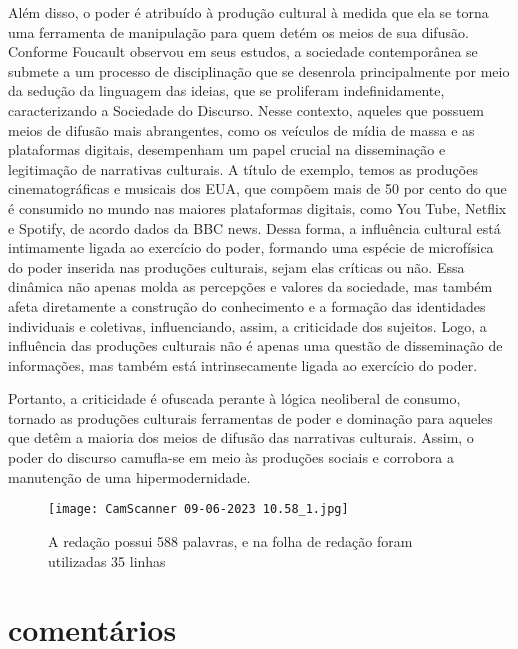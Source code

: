 \documentclass{article}
\begin{document}
Além disso, o poder é atribuído à produção cultural à medida que ela se torna uma ferramenta de manipulação para quem detém os meios de sua difusão. Conforme Foucault observou em seus estudos, a sociedade contemporânea se submete a um processo de disciplinação que se desenrola principalmente por meio da sedução da linguagem das ideias, que se proliferam indefinidamente, caracterizando a Sociedade do Discurso. Nesse contexto, aqueles que possuem meios de difusão mais abrangentes, como os veículos de mídia de massa e as plataformas digitais, desempenham um papel crucial na disseminação e legitimação de narrativas culturais. A título de exemplo, temos as produções cinematográficas e musicais dos EUA, que compõem mais de 50 por cento do que é consumido no mundo nas maiores plataformas digitais, como You Tube, Netflix e Spotify, de acordo dados da BBC news. Dessa forma, a influência cultural está intimamente ligada ao exercício do poder, formando uma espécie de microfísica do poder inserida nas produções culturais, sejam elas críticas ou não. Essa dinâmica não apenas molda as percepções e valores da sociedade, mas também afeta diretamente a construção do conhecimento e a formação das identidades individuais e coletivas, influenciando, assim, a criticidade dos sujeitos. Logo, a influência das produções culturais não é apenas uma questão de disseminação de informações, mas também está intrinsecamente ligada ao exercício do poder.

Portanto, a criticidade é ofuscada perante à lógica neoliberal de consumo, tornado as produções culturais ferramentas de poder e dominação para aqueles que detêm a maioria dos meios de difusão das narrativas culturais. Assim, o poder do discurso camufla-se em meio às produções sociais e corrobora a manutenção de uma hipermodernidade.
\newpage
\begin{figure}
\centering
\texttt{[image: CamScanner 09-06-2023 10.58\_1.jpg]}
\caption{\label{}A redação possui 588 palavras, e na folha de redação foram utilizadas 35 linhas}
\end{figure}
\section*{comentários}
\end{document}
